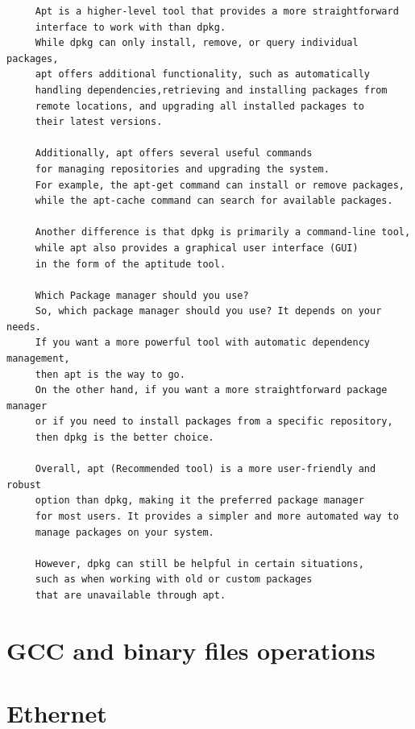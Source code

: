 \documentclass[a4paper,12pt]{article}
\begin{document}
\begin{verbatim}
     Apt is a higher-level tool that provides a more straightforward
     interface to work with than dpkg. 
     While dpkg can only install, remove, or query individual packages,
     apt offers additional functionality, such as automatically 
     handling dependencies,retrieving and installing packages from
     remote locations, and upgrading all installed packages to
     their latest versions.

     Additionally, apt offers several useful commands
     for managing repositories and upgrading the system.
     For example, the apt-get command can install or remove packages,
     while the apt-cache command can search for available packages.

     Another difference is that dpkg is primarily a command-line tool,
     while apt also provides a graphical user interface (GUI)
     in the form of the aptitude tool.

     Which Package manager should you use?
     So, which package manager should you use? It depends on your needs.
     If you want a more powerful tool with automatic dependency management,
     then apt is the way to go. 
     On the other hand, if you want a more straightforward package manager
     or if you need to install packages from a specific repository,
     then dpkg is the better choice.

     Overall, apt (Recommended tool) is a more user-friendly and robust
     option than dpkg, making it the preferred package manager 
     for most users. It provides a simpler and more automated way to
     manage packages on your system. 
     
     However, dpkg can still be helpful in certain situations,
     such as when working with old or custom packages 
     that are unavailable through apt.
\end{verbatim}
            
\section{GCC and binary files operations}


\section{Ethernet }
\end{document}
